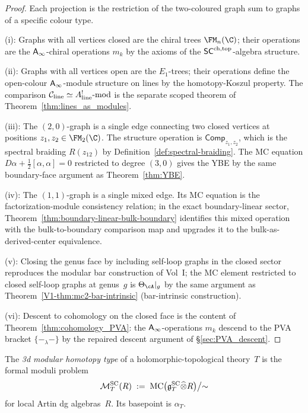 \begin{proof}
Each projection is the restriction of the two-coloured graph sum
to graphs of a specific colour type.

(i): Graphs with all vertices closed are the chiral trees
$\FM_n(\C)$; their operations are the $\mathsf{A}_{\infty}$-chiral operations
$m_k$ by the axioms of the $\mathsf{SC}^{\mathrm{ch,top}}$-algebra structure.

(ii): Graphs with all vertices open are the $E_1$-trees; their
operations define the open-colour $\mathsf{A}_{\infty}$-module structure on lines
by the homotopy-Koszul property. The comparison
$\mathcal C_{\mathrm{line}} \simeq A^!_{\mathrm{line}}\text{-mod}$ is the
separate scoped theorem of Theorem~\ref{thm:lines_as_modules}.

(iii): The $(2,0)$-graph is a single edge connecting two closed
vertices at positions $z_1, z_2 \in \FM_2(\C)$. The structure
operation is $\mathsf{Comp}_{z_1,z_2}$, which is the spectral
braiding $R(z_{12})$ by Definition~\ref{def:spectral-braiding}.
The MC equation $D\alpha + \tfrac{1}{2}[\alpha,\alpha] = 0$
restricted to degree $(3,0)$ gives the YBE by the same
boundary-face argument as Theorem~\ref{thm:YBE}.

(iv): The $(1,1)$-graph is a single mixed edge. Its MC equation is
the factorization-module consistency relation; in the exact
boundary-linear sector,
Theorem~\ref{thm:boundary-linear-bulk-boundary} identifies this
mixed operation with the bulk-to-boundary comparison map and upgrades
it to the bulk-as-derived-center equivalence.

(v): Closing the genus face by including self-loop graphs in the
closed sector reproduces the modular bar construction of Vol~I;
the MC element restricted to closed self-loop graphs at genus~$g$
is $\Theta_\cA|_{g}$ by the same argument as
Theorem~\ref*{V1-thm:mc2-bar-intrinsic} (bar-intrinsic construction).

(vi): Descent to cohomology on the closed face is the content of
Theorem~\ref{thm:cohomology_PVA}: the $\mathsf{A}_{\infty}$-operations $m_k$
descend to the PVA bracket $\{-_\lambda-\}$ by the repaired
descent argument of \S\ref{sec:PVA_descent}.
\end{proof}

\begin{definition}
The \emph{3d modular homotopy type} of a holomorphic-topological
theory~$T$ is the formal moduli problem
\[
\mathcal M^{\mathrm{SC}}_T(R)
\;:=\;
\operatorname{MC}\bigl(\mathfrak{g}^{\mathrm{SC}}_T \widehat{\otimes} R\bigr)\big/{\sim}
\]
for local Artin dg algebras~$R$. Its basepoint is $\alpha_T$.
\end{definition}

